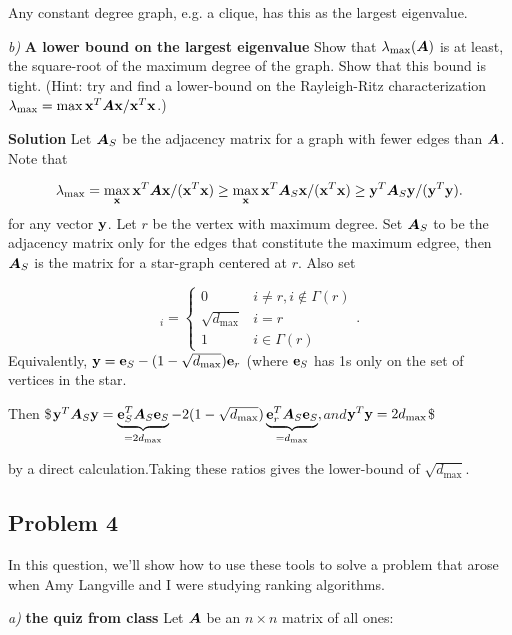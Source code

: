 \documentclass{article}
\begin{document}
Any constant degree graph, e.g. a clique, has this as the largest eigenvalue.

\emph{b)} \textbf{A lower bound on the largest eigenvalue} Show that $\lambda_{\max}(\boldsymbol{A})$ is at least, the square-root of the maximum degree of the graph. Show that this bound is tight. (Hint: try and find a lower-bound on the Rayleigh-Ritz characterization $\lambda_{\max} = \max \boldsymbol{\mathrm{x}}^T \boldsymbol{A} \boldsymbol{\mathrm{x}} / \boldsymbol{\mathrm{x}}^T \boldsymbol{\mathrm{x}}$.)

\textbf{Solution} Let $\boldsymbol{A}_S$ be the adjacency matrix for a graph with fewer edges than $\boldsymbol{A}$. Note that

\begin{displaymath}
\lambda_{\max} = \max_{\boldsymbol{\mathrm{x}}} \boldsymbol{\mathrm{x}}^T \boldsymbol{A} \boldsymbol{\mathrm{x}} / (\boldsymbol{\mathrm{x}}^T \boldsymbol{\mathrm{x}}) \ge \max_{\boldsymbol{\mathrm{x}}} \boldsymbol{\mathrm{x}}^T \boldsymbol{A}_S \boldsymbol{\mathrm{x}}/ (\boldsymbol{\mathrm{x}}^T \boldsymbol{\mathrm{x}}) \ge \boldsymbol{\mathrm{y}}^T \boldsymbol{A}_S \boldsymbol{\mathrm{y}} /(\boldsymbol{\mathrm{y}}^T \boldsymbol{\mathrm{y}}).
\end{displaymath}
for any vector $\boldsymbol{\mathrm{y}}$. Let $r$ be the vertex with maximum degree. Set $\boldsymbol{A}_S$ to be the adjacency matrix only for the edges that constitute the maximum edgree, then $\boldsymbol{A}_S$ is the matrix for a star-graph centered at $r$. Also set

\begin{displaymath}
[\vy]_i = \begin{cases} 0 & {i \not= r, i \not\in \Gamma(r)} \\ \sqrt{d_{\max}} & i = r \\ 1 & i \in \Gamma(r) \end{cases}.
\end{displaymath}
Equivalently, $\boldsymbol{\mathrm{y}} = \boldsymbol{\mathrm{e}}_S - (1 - \sqrt{d_{\max}})\boldsymbol{\mathrm{e}}_r$ (where $\boldsymbol{\mathrm{e}}_S$ has 1s only on the set of vertices in the star.

Then \$$\boldsymbol{\mathrm{y}}^T \boldsymbol{A}_S \boldsymbol{\mathrm{y}} = \underbrace{\boldsymbol{\mathrm{e}}_S^T \boldsymbol{A}_S \boldsymbol{\mathrm{e}}_S}_{=2 d_{\max}} - 2 (1 - \sqrt{d_{\max}}) \underbrace{\boldsymbol{\mathrm{e}}_r^T \boldsymbol{A}_S \boldsymbol{\mathrm{e}}_S}_{=d_{\max}},$$and$$\boldsymbol{\mathrm{y}}^T \boldsymbol{\mathrm{y}} = 2d_{\max}$\$

by a direct calculation.\newline Taking these ratios gives the lower-bound of $\sqrt{d_{\max}}$.

\hypertarget{problem_4_6}{}\subsection*{{Problem 4}}\label{problem_4_6}

In this question, we'{}ll show how to use these tools to solve a problem that arose when Amy Langville and I were studying ranking algorithms.

\emph{a)} \textbf{the quiz from class} Let $\boldsymbol{A}$ be an $n \times n$ matrix of all ones:
\end{document}
